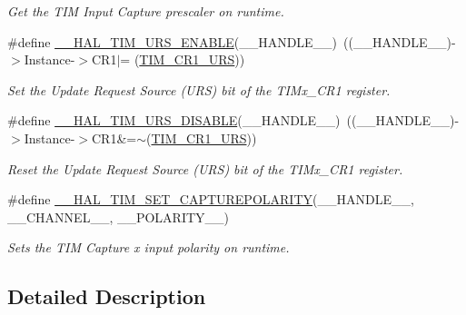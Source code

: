 \begin{DoxyCompactItemize}
\begin{DoxyCompactList}\small\item\em Get the T\+IM Input Capture prescaler on runtime. \end{DoxyCompactList}\item 
\#define \mbox{\hyperlink{group___t_i_m___exported___macros_ga3b06856bd6d7e10cfff342b1726db51d}{\+\_\+\+\_\+\+H\+A\+L\+\_\+\+T\+I\+M\+\_\+\+U\+R\+S\+\_\+\+E\+N\+A\+B\+LE}}(\+\_\+\+\_\+\+H\+A\+N\+D\+L\+E\+\_\+\+\_\+)~((\+\_\+\+\_\+\+H\+A\+N\+D\+L\+E\+\_\+\+\_\+)-\/$>$Instance-\/$>$C\+R1$\vert$= (\mbox{\hyperlink{group___peripheral___registers___bits___definition_ga06c997c2c23e8bef7ca07579762c113b}{T\+I\+M\+\_\+\+C\+R1\+\_\+\+U\+RS}}))
\begin{DoxyCompactList}\small\item\em Set the Update Request Source (U\+RS) bit of the T\+I\+Mx\+\_\+\+C\+R1 register. \end{DoxyCompactList}\item 
\#define \mbox{\hyperlink{group___t_i_m___exported___macros_gafacb551a4c537e62a0fe740b2f12236c}{\+\_\+\+\_\+\+H\+A\+L\+\_\+\+T\+I\+M\+\_\+\+U\+R\+S\+\_\+\+D\+I\+S\+A\+B\+LE}}(\+\_\+\+\_\+\+H\+A\+N\+D\+L\+E\+\_\+\+\_\+)~((\+\_\+\+\_\+\+H\+A\+N\+D\+L\+E\+\_\+\+\_\+)-\/$>$Instance-\/$>$C\+R1\&=$\sim$(\mbox{\hyperlink{group___peripheral___registers___bits___definition_ga06c997c2c23e8bef7ca07579762c113b}{T\+I\+M\+\_\+\+C\+R1\+\_\+\+U\+RS}}))
\begin{DoxyCompactList}\small\item\em Reset the Update Request Source (U\+RS) bit of the T\+I\+Mx\+\_\+\+C\+R1 register. \end{DoxyCompactList}\item 
\#define \mbox{\hyperlink{group___t_i_m___exported___macros_gac5d6989516caa67fae23a9329228cdc7}{\+\_\+\+\_\+\+H\+A\+L\+\_\+\+T\+I\+M\+\_\+\+S\+E\+T\+\_\+\+C\+A\+P\+T\+U\+R\+E\+P\+O\+L\+A\+R\+I\+TY}}(\+\_\+\+\_\+\+H\+A\+N\+D\+L\+E\+\_\+\+\_\+,  \+\_\+\+\_\+\+C\+H\+A\+N\+N\+E\+L\+\_\+\+\_\+,  \+\_\+\+\_\+\+P\+O\+L\+A\+R\+I\+T\+Y\+\_\+\+\_\+)
\begin{DoxyCompactList}\small\item\em Sets the T\+IM Capture x input polarity on runtime. \end{DoxyCompactList}\end{DoxyCompactItemize}


\subsection{Detailed Description}


